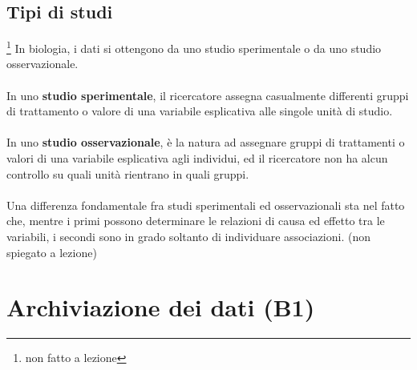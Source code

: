 \documentclass[drafts, 10pt]{book}
\begin{document}
\section{Tipi di studi}\footnote{non fatto a lezione}
In biologia, i dati si ottengono da uno studio sperimentale o da uno studio osservazionale.
\\
\\
In uno \textbf{studio sperimentale}, il ricercatore assegna casualmente differenti gruppi di trattamento o valore di una variabile esplicativa alle singole unità di studio.
\\
\\
In uno \textbf{studio osservazionale}, è la natura ad assegnare gruppi di trattamenti o valori di una variabile esplicativa agli individui, ed il ricercatore non ha alcun controllo su quali unità rientrano in quali gruppi.
\\
\\
Una differenza fondamentale fra studi sperimentali ed osservazionali sta nel fatto che, mentre i primi possono determinare le relazioni di causa ed effetto tra le variabili, i secondi sono in grado soltanto di individuare associazioni.
(non spiegato a lezione)

\chapter{Archiviazione dei dati (B1)}
\end{document}
